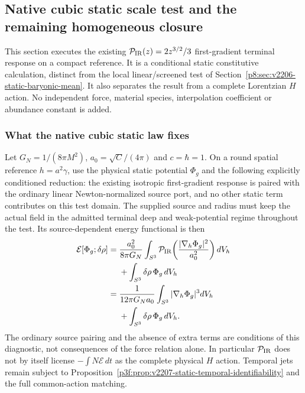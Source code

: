 \documentclass[12pt,a4paper]{article}
\begin{document}
\subsection{Native cubic static scale test and the remaining homogeneous closure}
\label{p8:sec:v2207-native-static-h-closure}

This section executes the existing
$\mathcal P_{\rm IR}(z)=2z^{3/2}/3$ first-gradient terminal response on a
compact reference. It is a conditional static constitutive calculation,
distinct from the local linear/screened test of
Section~\ref{p8:sec:v2206-static-baryonic-mean}. It also separates the
result from a complete Lorentzian $H$ action. No independent force,
material species, interpolation coefficient or abundance constant is added.

\subsubsection{What the native cubic static law fixes}
Let $G_N=1/(8\pi M^2)$, $a_0=\sqrt C/(4\pi)$ and $c=\hbar=1$.
On a round spatial reference $h=a^2\gamma$, use the physical static potential
$\Phi_g$ and the following explicitly conditioned reduction: the existing
isotropic first-gradient response is paired with the ordinary linear
Newton-normalized source port, and no other static term contributes on
this test domain. The supplied source and radius must keep the actual
field in the admitted terminal deep and weak-potential regime throughout
the test. Its source-dependent energy functional is then
\begin{equation}
\label{p8:eq:v2207-cubic-static-functional}
 \begin{aligned}
 \mathcal E[\Phi_g;\delta\rho]
  ={}&\frac{a_0^2}{8\pi G_N}\int_{S^3}
    \mathcal P_{\rm IR}\!\left(\frac{|\nabla_h\Phi_g|^2}{a_0^2}\right)dV_h\\
  &+\int_{S^3}\delta\rho\,\Phi_g\,dV_h\\
  ={}&\frac1{12\pi G_Na_0}\int_{S^3}|\nabla_h\Phi_g|^3dV_h\\
  &+\int_{S^3}\delta\rho\,\Phi_g\,dV_h.
 \end{aligned}
\end{equation}
The ordinary source pairing and the absence of extra terms are conditions
of this diagnostic, not consequences of the force relation alone.
In particular $\mathcal P_{\rm IR}$ does not by itself license
$-\int N\mathcal E\,dt$ as the complete physical $H$ action. Temporal
jets remain subject to
Proposition~\ref{p3f:prop:v2207-static-temporal-identifiability} and the
full common-action matching.
\end{document}
